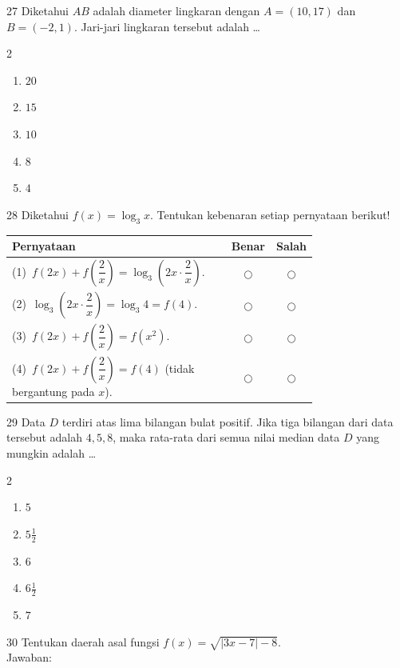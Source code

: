 \documentclass[11pt]{article}
\newenvironment{pilB}{%
  \par\smallskip\begin{multicols}{2}
  \begin{enumerate}[label=(\Alph*),leftmargin=*,itemsep=1pt,topsep=3pt]}%
  {\end{enumerate}\end{multicols}}
\begin{document}
\begin{soal}{27}
Diketahui $AB$ adalah diameter lingkaran dengan $A=(10,17)$ dan
$B=(-2,1)$. Jari-jari lingkaran tersebut adalah \ldots
\begin{pilB}
  \item $20$ \item $15$ \item $10$ \item $8$ \item $4$
\end{pilB}
\end{soal}

\begin{soal}{28}
Diketahui $f(x)=\log_3 x$.
Tentukan kebenaran setiap pernyataan berikut!

\par\smallskip
{\renewcommand{\arraystretch}{1.4}%
\begin{tabular}{@{}p{0.76\linewidth}cc@{}}
\hline
\textbf{Pernyataan} & \textbf{Benar} & \textbf{Salah}\\
\hline
(1)~$f(2x)+f\!\left(\dfrac{2}{x}\right)=\log_3\!\left(2x\cdot\dfrac{2}{x}\right)$.
  & $\bigcirc$ & $\bigcirc$\\
(2)~$\log_3\!\left(2x\cdot\dfrac{2}{x}\right)=\log_3 4=f(4)$.
  & $\bigcirc$ & $\bigcirc$\\
(3)~$f(2x)+f\!\left(\dfrac{2}{x}\right)=f(x^2)$.
  & $\bigcirc$ & $\bigcirc$\\
(4)~$f(2x)+f\!\left(\dfrac{2}{x}\right)=f(4)$ (tidak bergantung pada $x$).
  & $\bigcirc$ & $\bigcirc$\\
\hline
\end{tabular}}
\end{soal}

\begin{soal}{29}
Data $D$ terdiri atas lima bilangan bulat positif. Jika tiga bilangan
dari data tersebut adalah $4,5,8$, maka rata-rata dari semua nilai
median data $D$ yang mungkin adalah \ldots
\begin{pilB}
  \item $5$ \item $5\tfrac{1}{2}$ \item $6$ \item $6\tfrac{1}{2}$ \item $7$
\end{pilB}
\end{soal}

\begin{soal}{30}
Tentukan daerah asal fungsi $f(x)=\sqrt{|3x-7|-8}$.\\[0.4em]
Jawaban:\enspace\underline{\hspace{7cm}}
\end{soal}
\end{document}
